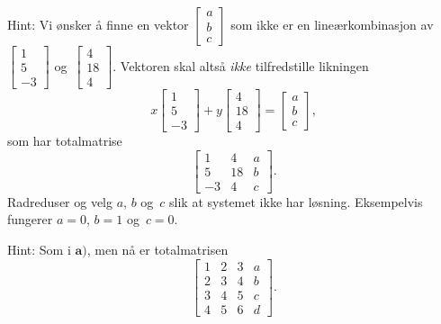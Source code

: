 \begin{losning}
\begin{punkt}
Hint: Vi ønsker å finne en vektor $\begin{bmatrix}
a\\
b\\
c
\end{bmatrix}$ som ikke er en lineærkombinasjon av 
$
\begin{bmatrix}
	1\\
	5\\
	-3
\end{bmatrix}$ og~$
\begin{bmatrix}
	4\\
	18\\
	4
\end{bmatrix}$. Vektoren skal altså \emph{ikke} tilfredstille likningen 
$$x
\begin{bmatrix}
1\\
5\\
-3
\end{bmatrix}+y
\begin{bmatrix}
4\\
18\\
4
\end{bmatrix}=
\begin{bmatrix}
a\\
b\\
c
\end{bmatrix},$$
som har totalmatrise
$$\begin{bmatrix}
1  & 4  & a\\
5  & 18 & b\\
-3 & 4  & c
\end{bmatrix}.$$ Radreduser og velg $a$, $b$ og~$c$ slik at systemet ikke har løsning. Eksempelvis fungerer $a=0$, $b=1$ og~$c=0$.
\end{punkt}
\begin{punkt}
Hint: Som i $\textbf{a)}$, men nå er totalmatrisen
$$\begin{bmatrix}
1 & 2 & 3 & a\\
2 & 3 & 4 & b\\
3 & 4 & 5 & c\\
4 & 5 & 6 & d
\end{bmatrix}.$$
\end{punkt}
\end{losning}


